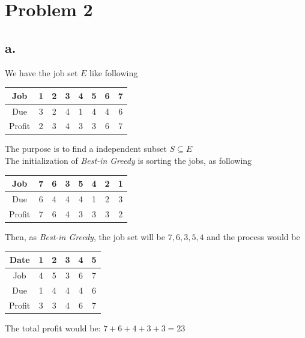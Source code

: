 \documentclass{article}
\begin{document}
\section*{Problem 2}{
    \subsection*{a.}{
        We have the job set \(\mathit{E}\) like following
        \begin{center}{
            \begin{tabular}{|c|c|c|c|c|c|c|c|}
            \hline
            Job & 1 & 2 & 3 & 4 & 5 & 6 & 7 \\
            \hline
            Due & 3 & 2 & 4 & 1 & 4 & 4 & 6 \\
            \hline
            Profit & 2 & 3 & 4 & 3 & 3 & 6 & 7 \\
            \hline
            \end{tabular}
        }
        \end{center} 
        The purpose is to find a independent subset \(\mathit{S} \subseteq \mathit{E}\)\\
        The initialization of \textit{Best-in Greedy} is sorting the jobs, as following
        \begin{center}{
            \begin{tabular}{|c|c|c|c|c|c|c|c|}
            \hline
            Job & 7 & 6 & 3 & 5 & 4 & 2 & 1 \\
            \hline
            Due & 6 & 4 & 4 & 4 & 1 & 2 & 3 \\
            \hline
            Profit & 7 & 6 & 4 & 3 & 3 & 3 & 2 \\
            \hline
            \end{tabular}
        }
        \end{center} 
        Then, as \textit{Best-in Greedy}, the job set will be \( \mathrm{7, 6, 3, 5, 4}\) and the process would be
        \begin{center}{
            \begin{tabular}{|c|c|c|c|c|c|}
            \hline
            Date & 1 & 2 & 3 & 4 & 5 \\
            \hline
            Job & 4 & 5 & 3 & 6 & 7 \\
            \hline
            Due & 1 & 4 & 4 & 4 & 6 \\
            \hline
            Profit & 3 & 3 & 4 & 6 & 7 \\
            \hline
            \end{tabular}
        }
        \end{center}
        The total profit would be: \(\mathrm{7 + 6 + 4 + 3 + 3 = 23}\)
    }
}
\end{document}
